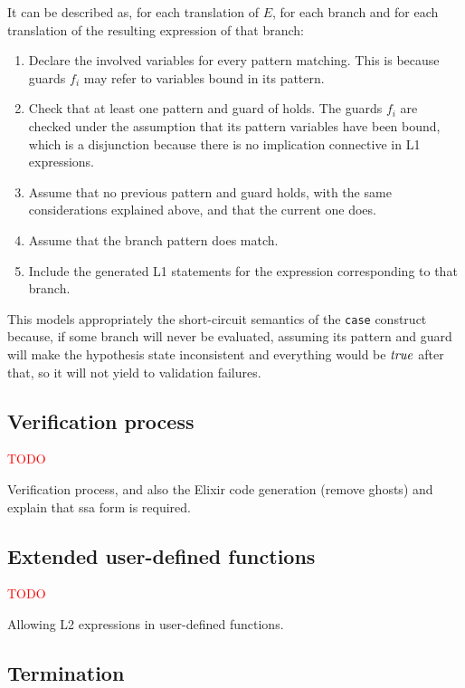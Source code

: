 It can be described as, for each translation of $E$, for each branch and for 
each translation of the resulting expression of that branch:

\begin{enumerate}
  \item Declare the involved variables for every pattern matching. This is because guards $f_i$ may refer to variables bound in its pattern.
  \item Check that at least one pattern and guard of holds. The guards $f_i$ are checked under the assumption that its pattern variables have been bound, which is a disjunction because there is no implication connective in L1 expressions.
  \item Assume that no previous pattern and guard holds, with the same considerations explained above, and that the current one does.
  \item Assume that the branch pattern does match.
  \item Include the generated L1 statements for the expression corresponding to that branch.
\end{enumerate}

This models appropriately the short-circuit semantics of the \verb|case|
construct because, if some branch will never be evaluated, assuming its pattern
and guard will make the hypothesis state inconsistent and everything would be
$\mathit{true}$ after that, so it will not yield to validation failures.

\subsection{Verification process}

\textcolor{red}{TODO}

Verification process, and also the Elixir code generation (remove ghosts) and
explain that \gls{ssa} form is required.

\subsection{Extended user-defined functions}

\textcolor{red}{TODO}

Allowing L2 expressions in user-defined functions.

\subsection{Termination}

